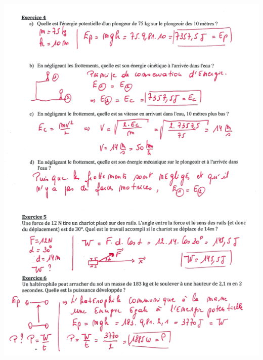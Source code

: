 \includegraphics[width=18.251cm,height=25.141cm]{Pictures/100000010000024A00000328B79BD0C63CC6F682.png}


